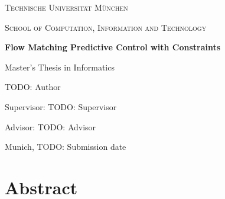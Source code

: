 \documentclass[headsepline,footsepline,footinclude=false,oneside,fontsize=11pt,paper=a4,listof=totoc,bibliography=totoc]{scrbook}
\newcommand*{\getUniversity}{Technische Universität München}
\newcommand*{\getDegree}{Informatics}
\newcommand*{\getSchool}{Computation, Information and Technology}
\newcommand*{\getTitle}{Flow Matching Predictive Control with Constraints}
\newcommand*{\getAuthor}{TODO: Author}
\newcommand*{\getDoctype}{Master's Thesis in \getDegree}
\newcommand*{\getSupervisor}{TODO: Supervisor}
\newcommand*{\getAdvisor}{TODO: Advisor}
\newcommand*{\getSubmissionDate}{TODO: Submission date}
\newcommand*{\getSubmissionLocation}{Munich}
\theoremstyle{definition}
\theoremstyle{plain}
\theoremstyle{remark}
\begin{document}
\ifstandalone
  \begin{titlepage}
    \centering
    \vspace*{2cm}
    {\scshape\LARGE \getUniversity\par}
    \vspace{0.5cm}
    {\scshape\large School of \getSchool\par}
    \vspace{2.5cm}
    {\huge\bfseries \getTitle\par}
    \vspace{1cm}
    {\Large \getDoctype\par}
    \vfill
    {\large \getAuthor\par}
    \vspace{1cm}
    {\large Supervisor: \getSupervisor\par}
    {\large Advisor: \getAdvisor\par}
    \vspace{1cm}
    {\large \getSubmissionLocation, \getSubmissionDate\par}
  \end{titlepage}
  \chapter*{Abstract}
\else
  
  \frontmatter{}
  
  
  
  
\fi
\end{document}
